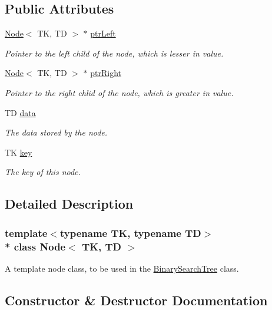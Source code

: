 \subsection*{Public Attributes}
\begin{DoxyCompactItemize}
\item 
\hyperlink{classNode}{Node}$<$ TK, TD $>$ $\ast$ \hyperlink{classNode_a98e0618e17b682e76c861f747a40c960}{ptr\+Left}
\begin{DoxyCompactList}\small\item\em Pointer to the left child of the node, which is lesser in value. \end{DoxyCompactList}\item 
\hyperlink{classNode}{Node}$<$ TK, TD $>$ $\ast$ \hyperlink{classNode_a593bc4a915d083d34a92783f53c573e8}{ptr\+Right}
\begin{DoxyCompactList}\small\item\em Pointer to the right chlid of the node, which is greater in value. \end{DoxyCompactList}\item 
TD \hyperlink{classNode_ace127a609bfd32a340e6777d2c46aa23}{data}
\begin{DoxyCompactList}\small\item\em The data stored by the node. \end{DoxyCompactList}\item 
TK \hyperlink{classNode_ac1b1951db38766e3441c42cfa27e716e}{key}
\begin{DoxyCompactList}\small\item\em The key of this node. \end{DoxyCompactList}\end{DoxyCompactItemize}


\subsection{Detailed Description}
\subsubsection*{template$<$typename TK, typename TD$>$\\*
class Node$<$ T\+K, T\+D $>$}

A template node class, to be used in the \hyperlink{classBinarySearchTree}{Binary\+Search\+Tree} class. 

\subsection{Constructor \& Destructor Documentation}
